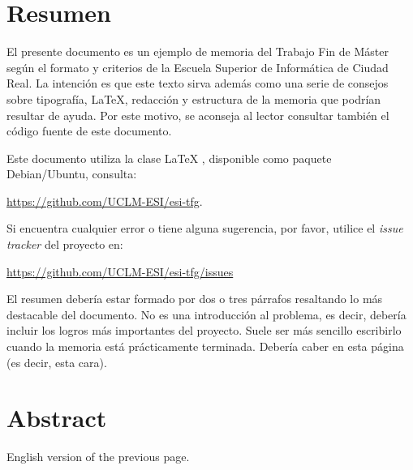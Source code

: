 \chapter{Resumen}

El presente documento es un ejemplo de memoria del Trabajo Fin de Máster según
el formato y criterios de la Escuela Superior de Informática de Ciudad Real. La
intención es que este texto sirva además como una serie de consejos sobre
tipografía, \LaTeX, redacción y estructura de la memoria que podrían resultar de
ayuda. Por este motivo, se aconseja al lector consultar también el código fuente
de este documento.

Este documento utiliza la clase \LaTeX{} \esitfm{}, disponible como paquete
Debian/Ubuntu, consulta:

\url{https://github.com/UCLM-ESI/esi-tfg}.

Si encuentra cualquier error o tiene alguna sugerencia, por favor, utilice
el \emph{issue tracker} del proyecto \esitfm{} en:

\url{https://github.com/UCLM-ESI/esi-tfg/issues}

El resumen debería estar formado por dos o tres párrafos resaltando lo más
destacable del documento. No es una introducción al problema, es decir, debería
incluir los logros más importantes del proyecto. Suele ser más sencillo
escribirlo cuando la memoria está prácticamente terminada. Debería caber en esta
página (es decir, esta cara).


\chapter{Abstract}

English version of the previous page.
